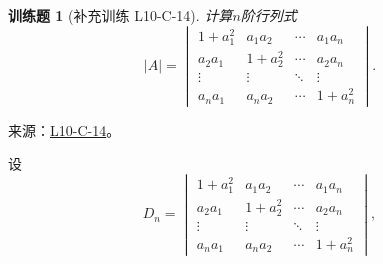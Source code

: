\documentclass[12pt,fontset=fandol]{ctexart}
\newtheorem{exercise}{训练题}[section]
\begin{document}
\begin{exercise}[补充训练 L10-C-14]\label{prob:L10-C-14}
计算$n$阶行列式
        \[|A|=\begin{vmatrix}
                1+a_1^2 & a_1a_2  & \cdots & a_1a_n  \\
                a_2a_1  & 1+a_2^2 & \cdots & a_2a_n  \\
                \vdots  & \vdots  & \ddots & \vdots  \\
                a_na_1  & a_na_2  & \cdots & 1+a_n^2
            \end{vmatrix}.\]
\end{exercise}
\noindent 来源：\href{https://github.com/yhwu-is/Linear-Algebra-Left-Undone/blob/new/%E8%AE%B2%E4%B9%89/%E4%B8%93%E9%A2%98/10%20%E8%A1%8C%E5%88%97%E5%BC%8F.tex}{L10-C-14}。
\begin{solve}
设
            \[
                D_n = \begin{vmatrix}
                    1+a_1^2 & a_1a_2  & \cdots & a_1a_n  \\
                    a_2a_1  & 1+a_2^2 & \cdots & a_2a_n  \\
                    \vdots  & \vdots  & \ddots & \vdots  \\
                    a_na_1  & a_na_2  & \cdots & 1+a_n^2
                \end{vmatrix},
            \]


\end{solve}
\end{document}
